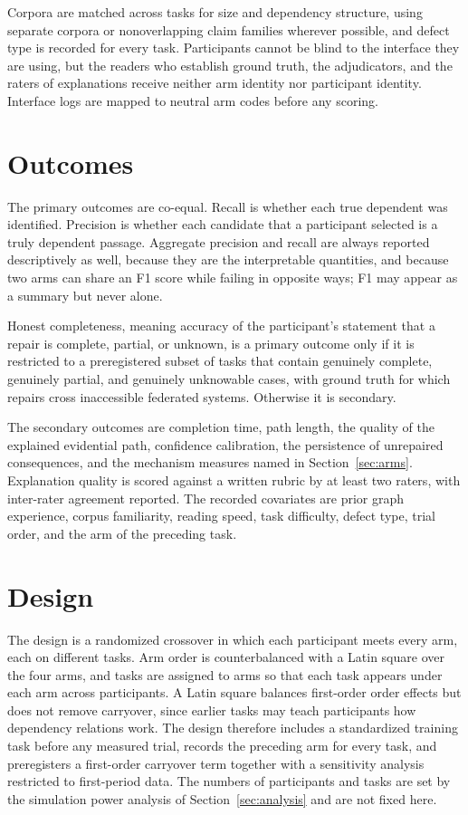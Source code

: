 \documentclass[11pt]{article}
\theoremstyle{definition}
\begin{document}
Corpora are matched across tasks for size and dependency structure, using separate corpora or nonoverlapping claim families wherever possible, and defect type is recorded for every task. Participants cannot be blind to the interface they are using, but the readers who establish ground truth, the adjudicators, and the raters of explanations receive neither arm identity nor participant identity. Interface logs are mapped to neutral arm codes before any scoring.

\section{Outcomes}

The primary outcomes are co-equal. Recall is whether each true dependent was identified. Precision is whether each candidate that a participant selected is a truly dependent passage. Aggregate precision and recall are always reported descriptively as well, because they are the interpretable quantities, and because two arms can share an F1 score while failing in opposite ways; F1 may appear as a summary but never alone.

Honest completeness, meaning accuracy of the participant's statement that a repair is complete, partial, or unknown, is a primary outcome only if it is restricted to a preregistered subset of tasks that contain genuinely complete, genuinely partial, and genuinely unknowable cases, with ground truth for which repairs cross inaccessible federated systems. Otherwise it is secondary.

The secondary outcomes are completion time, path length, the quality of the explained evidential path, confidence calibration, the persistence of unrepaired consequences, and the mechanism measures named in Section~\ref{sec:arms}. Explanation quality is scored against a written rubric by at least two raters, with inter-rater agreement reported. The recorded covariates are prior graph experience, corpus familiarity, reading speed, task difficulty, defect type, trial order, and the arm of the preceding task.

\section{Design}

The design is a randomized crossover in which each participant meets every arm, each on different tasks. Arm order is counterbalanced with a Latin square over the four arms, and tasks are assigned to arms so that each task appears under each arm across participants. A Latin square balances first-order order effects but does not remove carryover, since earlier tasks may teach participants how dependency relations work. The design therefore includes a standardized training task before any measured trial, records the preceding arm for every task, and preregisters a first-order carryover term together with a sensitivity analysis restricted to first-period data. The numbers of participants and tasks are set by the simulation power analysis of Section~\ref{sec:analysis} and are not fixed here.
\end{document}
